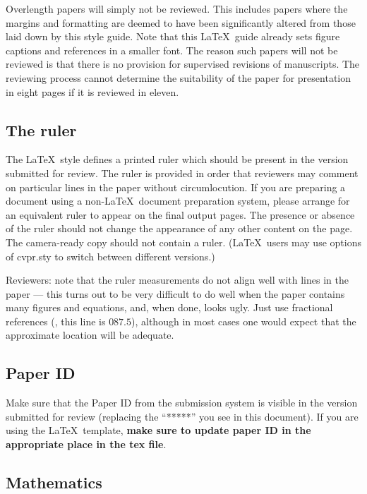 \documentclass[10pt,twocolumn,letterpaper]{article}
\begin{document}
Overlength papers will simply not be reviewed.
This includes papers where the margins and formatting are deemed to have been significantly altered from those laid down by this style guide.
Note that this \LaTeX\ guide already sets figure captions and references in a smaller font.
The reason such papers will not be reviewed is that there is no provision for supervised revisions of manuscripts.
The reviewing process cannot determine the suitability of the paper for presentation in eight pages if it is reviewed in eleven.

\subsection{The ruler}
The \LaTeX\ style defines a printed ruler which should be present in the version submitted for review.
The ruler is provided in order that reviewers may comment on particular lines in the paper without circumlocution.
If you are preparing a document using a non-\LaTeX\ document preparation system, please arrange for an equivalent ruler to appear on the final output pages.
The presence or absence of the ruler should not change the appearance of any other content on the page.
The camera-ready copy should not contain a ruler.
(\LaTeX\ users may use options of cvpr.sty to switch between different versions.)

Reviewers:
note that the ruler measurements do not align well with lines in the paper --- this turns out to be very difficult to do well when the paper contains many figures and equations, and, when done, looks ugly.
Just use fractional references (\eg, this line is $087.5$), although in most cases one would expect that the approximate location will be adequate.


\subsection{Paper ID}
Make sure that the Paper ID from the submission system is visible in the version submitted for review (replacing the ``*****'' you see in this document).
If you are using the \LaTeX\ template, \textbf{make sure to update paper ID in the appropriate place in the tex file}.


\subsection{Mathematics}
\end{document}
